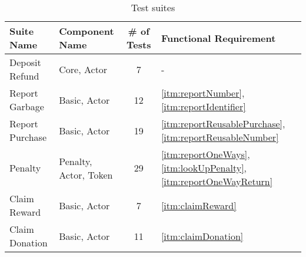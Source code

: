 
\begin{table}[hbt]
	\centering
  	\begin{tabular}{l|l|c|l}
	    Suite Name & Component Name & \# of Tests & Functional Requirement \\
	    \hline
	    Deposit Refund & Core, Actor & 7 & - \\
	    Report Garbage & Basic, Actor & 12 & \ref{itm:reportNumber}, \ref{itm:reportIdentifier} \\
	    Report Purchase & Basic, Actor & 19 & \ref{itm:reportReusablePurchase}, \ref{itm:reportReusableNumber} \\
		Penalty & Penalty, Actor, Token & 29 & \ref{itm:reportOneWays}, \ref{itm:lookUpPenalty}, \ref{itm:reportOneWayReturn} \\ 
		Claim Reward & Basic, Actor & 7 & \ref{itm:claimReward} \\
		Claim Donation & Basic, Actor & 11 & \ref{itm:claimDonation} \\
  	\end{tabular}
  	\caption{Test suites}
  	\label{tab:testSuites}
\end{table}

\FloatBarrier

